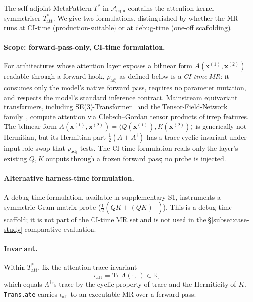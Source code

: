 \documentclass[acmsmall,screen,review]{acmart}
\begin{document}
The self-adjoint MetaPattern $T^{*}$ in $\mathcal{A}_{\mathrm{equi}}$ contains the attention-kernel symmetriser $T^{*}_{\mathrm{att}}$. We give two formulations, distinguished by whether the MR runs at CI-time (production-suitable) or at debug-time (one-off scaffolding).

\paragraph{Scope: forward-pass-only, CI-time formulation.} For architectures whose attention layer exposes a bilinear form $A(\mathbf{x}^{(1)}, \mathbf{x}^{(2)})$ readable through a forward hook, $\rho_{\mathrm{adj}}$ as defined below is a \emph{CI-time MR}: it consumes only the model's native forward pass, requires no parameter mutation, and respects the model's standard inference contract. Mainstream equivariant transformers, including SE(3)-Transformer~\cite{FuchsTransformer2020} and the Tensor-Field-Network family~\cite{ThomasSmidt2018}, compute attention via Clebsch--Gordan tensor products of irrep features. The bilinear form $A(\mathbf{x}^{(1)}, \mathbf{x}^{(2)}) = \langle Q(\mathbf{x}^{(1)}), K(\mathbf{x}^{(2)}) \rangle$ is generically not Hermitian, but its Hermitian part $\tfrac{1}{2}(A + A^{\dagger})$ has a trace-cyclic invariant under input role-swap that $\rho_{\mathrm{adj}}$ tests. The CI-time formulation reads only the layer's existing $Q,K$ outputs through a frozen forward pass; no probe is injected.

\paragraph{Alternative harness-time formulation.} A debug-time formulation, available in supplementary S1, instruments a symmetric Gram-matrix probe ($\frac{1}{2}(QK + (QK)^\top)$). This is a debug-time scaffold; it is not part of the CI-time MR set and is not used in the §\ref{subsec:case-study} comparative evaluation.

\paragraph{Invariant.} Within $T^{*}_{\mathrm{att}}$, fix the attention-trace invariant
$$\iota_{\mathrm{att}} = \mathrm{Tr}\,A(\cdot, \cdot) \in \mathbb{R},$$
which equals $A^{\dagger}$'s trace by the cyclic property of trace and the Hermiticity of $K$. \texttt{Translate} carries $\iota_{\mathrm{att}}$ to an executable MR over a forward pass:
\end{document}
